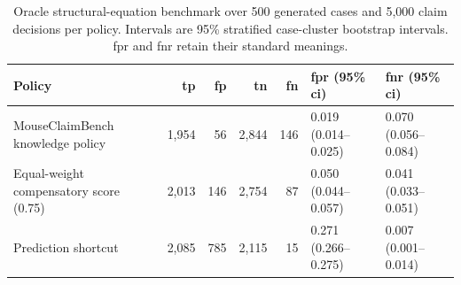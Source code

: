 \begin{table}[t!]
\centering
\caption{Oracle structural-equation benchmark over 500 generated cases and
5,000 claim decisions per policy. Intervals are 95\% stratified case-cluster
bootstrap intervals. \acs{fpr} and \acs{fnr} retain their standard meanings.}
\label{tab:oracle-policy-comparison}
\small
\renewcommand{\arraystretch}{1.13}
\begin{tabularx}{\textwidth}{@{}p{}rrrrYY@{}}
\toprule
Policy & \acs{tp} & \acs{fp} & \acs{tn} & \acs{fn} & \acs{fpr} (95\% \acs{ci}) & \acs{fnr} (95\% \acs{ci}) \\
\midrule
MouseClaimBench knowledge policy & 1,954 & 56 & 2,844 & 146 & 0.019 (0.014--0.025) & 0.070 (0.056--0.084) \\
Equal-weight compensatory score (0.75) & 2,013 & 146 & 2,754 & 87 & 0.050 (0.044--0.057) & 0.041 (0.033--0.051) \\
Prediction shortcut & 2,085 & 785 & 2,115 & 15 & 0.271 (0.266--0.275) & 0.007 (0.001--0.014) \\
\bottomrule
\end{tabularx}
\end{table}
